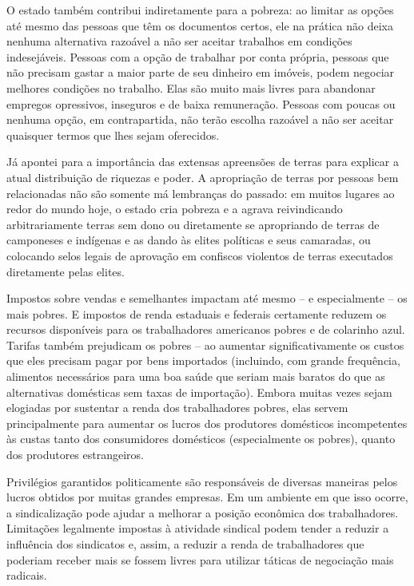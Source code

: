 O estado também contribui indiretamente para a pobreza: ao limitar as opções até mesmo das pessoas que têm os documentos certos, ele na prática não deixa nenhuma alternativa razoável a não ser aceitar trabalhos em condições indesejáveis. Pessoas com a opção de trabalhar por conta própria, pessoas que não precisam gastar a maior parte de seu dinheiro em imóveis, podem negociar melhores condições no trabalho. Elas são muito mais livres para abandonar empregos opressivos, inseguros e de baixa remuneração. Pessoas com poucas ou nenhuma opção, em contrapartida, não terão escolha razoável a não ser aceitar quaisquer termos que lhes sejam oferecidos.

Já apontei para a importância das extensas apreensões de terras para explicar a atual distribuição de riquezas e poder. A apropriação de terras por pessoas bem relacionadas não são somente má lembranças do passado: em muitos lugares ao redor do mundo hoje, o estado cria pobreza e a agrava reivindicando arbitrariamente terras sem dono ou diretamente se apropriando de terras de camponeses e indígenas e as dando às elites políticas e seus camaradas, ou colocando selos legais de aprovação em confiscos violentos de terras executados diretamente pelas elites.

Impostos sobre vendas e semelhantes impactam até mesmo -- e especialmente -- os mais pobres. E impostos de renda estaduais e federais certamente reduzem os recursos disponíveis para os trabalhadores americanos pobres e de colarinho azul. Tarifas também prejudicam os pobres -- ao aumentar significativamente os custos que eles precisam pagar por bens importados (incluindo, com grande frequência, alimentos necessários para uma boa saúde que seriam mais baratos do que as alternativas domésticas sem taxas de importação). Embora muitas vezes sejam elogiadas por sustentar a renda dos trabalhadores pobres, elas servem principalmente para aumentar os lucros dos produtores domésticos incompetentes às custas tanto dos consumidores domésticos (especialmente os pobres), quanto dos produtores estrangeiros.

Privilégios garantidos politicamente são responsáveis de diversas maneiras pelos lucros obtidos por muitas grandes empresas. Em um ambiente em que isso ocorre, a sindicalização pode ajudar a melhorar a posição econômica dos trabalhadores. Limitações legalmente impostas à atividade sindical podem tender a reduzir a influência dos sindicatos e, assim, a reduzir a renda de trabalhadores que poderiam receber mais se fossem livres para utilizar táticas de negociação mais radicais.

